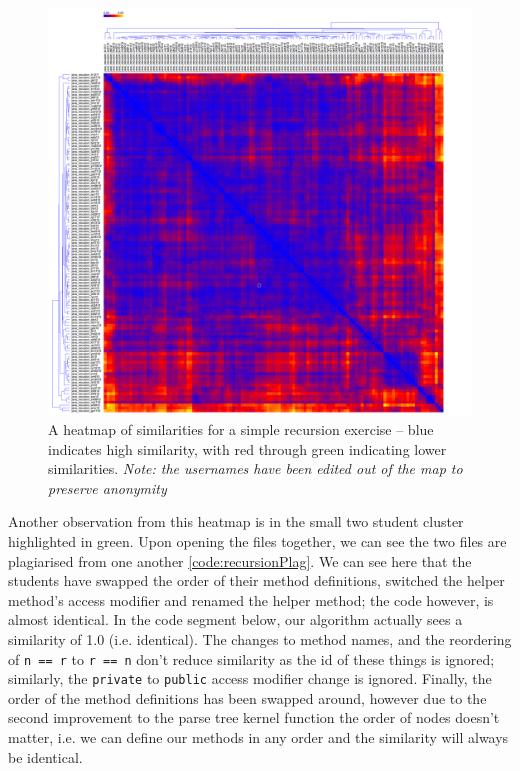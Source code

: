\begin{figure}

	\centering
		\includegraphics[width=1.2\textwidth]{Figures/RecursionHeatmap}
	\caption{A heatmap of similarities for a simple recursion exercise -- blue
	indicates high similarity, with red through green indicating lower
	similarities. \emph{Note: the usernames have been edited out of the map
	to preserve anonymity}}
	\label{fig:recursionHeatmap}

\end{figure}

Another observation from this heatmap is in the small two student cluster highlighted
in green. Upon opening the files together, we can see the two files are
plagiarised from one another \cref{code:recursionPlag}. We can see here that the
students have swapped the order of their method definitions, switched the
helper method's access modifier and renamed the helper method; the code however,
is almost identical. In the code segment below, our algorithm actually sees a
similarity of 1.0 (i.e. identical). The changes to method names, and the
reordering of \texttt{n == r} to \texttt{r == n} don't reduce similarity
as the id of these things is ignored; similarly, the \texttt{private} to 
\texttt{public} access modifier change is ignored. Finally, the order of the
method definitions has been swapped around, however due to the second improvement
to the parse tree kernel function 
the order of nodes doesn't matter, i.e. we can define our methods in any order
and the similarity will always be identical.

